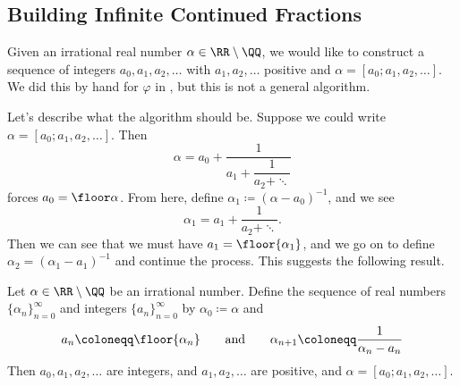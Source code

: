 \documentclass[../notes.tex]{subfiles}
\begin{document}
\subsection{Building Infinite Continued Fractions}
Given an irrational real number $\alpha\in\RR\setminus\QQ$, we would like to construct a sequence of integers $a_0,a_1,a_2,\ldots$ with $a_1,a_2,\ldots$ positive and $\alpha=[a_0;a_1,a_2,\ldots]$. We did this by hand for $\varphi$ in , but this is not a general algorithm.

Let's describe what the algorithm should be. Suppose we could write $\alpha=[a_0;a_1,a_2,\ldots]$. Then
\[\alpha=a_0+\dfrac1{a_1+\dfrac1{a_2+\ddots}}\]
forces $a_0=\floor\alpha$. From here, define $\alpha_1\coloneqq(\alpha-a_0)^{-1}$, and we see
\[\alpha_1=a_1+\dfrac1{a_2+\ddots}.\]
Then we can see that we must have $a_1=\floor{\alpha_1}$, and we go on to define $\alpha_2=(\alpha_1-a_1)^{-1}$ and continue the process. This suggests the following result.
\begin{proposition} \label{prop:cf-algo}
	Let $\alpha\in\RR\setminus\QQ$ be an irrational number. Define the sequence of real numbers $\{\alpha_n\}_{n=0}^\infty$ and integers $\{a_n\}_{n=0}^\infty$ by $\alpha_0\coloneqq\alpha$ and
	\[a_n\coloneqq\floor{\alpha_n}\qquad\text{and}\qquad\alpha_{n+1}\coloneqq\frac1{\alpha_n-a_n}\]
	Then $a_0,a_1,a_2,\ldots$ are integers, and $a_1,a_2,\ldots$ are positive, and $\alpha=[a_0;a_1,a_2,\ldots]$.
\end{proposition}
\end{document}
